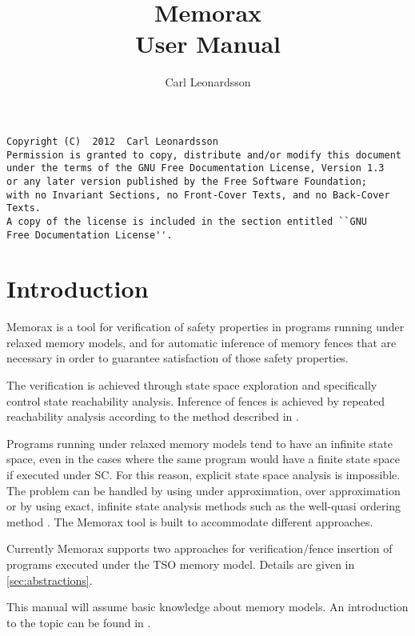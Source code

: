 \documentclass[a4paper]{article}
\title{Memorax\\\small{User Manual}}
\author{Carl Leonardsson}
\newcommand{\tool}{Memorax} %
\newcommand{\Thetool}{The Memorax tool} %
\begin{document}
\maketitle

\pagebreak

\begin{verbatim}
Copyright (C)  2012  Carl Leonardsson
Permission is granted to copy, distribute and/or modify this document
under the terms of the GNU Free Documentation License, Version 1.3
or any later version published by the Free Software Foundation;
with no Invariant Sections, no Front-Cover Texts, and no Back-Cover Texts.
A copy of the license is included in the section entitled ``GNU
Free Documentation License''.
\end{verbatim}

\pagebreak

\tableofcontents

\section{Introduction}

\tool{} is a tool for verification of safety properties in programs
running under relaxed memory models, and for automatic inference of
memory fences that are necessary in order to guarantee satisfaction of
those safety properties.

The verification is achieved through state space exploration and
specifically control state reachability analysis. Inference of fences
is achieved by repeated reachability analysis according to the method
described in \cite{AACLR12}. 

Programs running under relaxed memory models tend to have an infinite
state space, even in the cases where the same program would have a
finite state space if executed under SC. For this reason, explicit
state space analysis is impossible. The problem can be handled by
using under approximation, over approximation or by using exact,
infinite state analysis methods such as the well-quasi ordering
method \cite{ACJT96}. \Thetool{} is built to accommodate different
approaches. 

Currently \tool{} supports two approaches for verification/fence
insertion of programs executed under the TSO memory model. Details are
given in \cref{sec:abstractions}.

This manual will assume basic knowledge about memory models. An
introduction to the topic can be found in \cite{adve-gharachorloo-96}.
\end{document}
